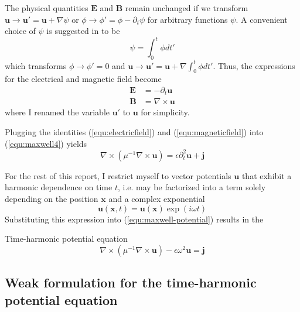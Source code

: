 \documentclass[11pt, a4paper]{article}
\begin{document}
The physical quantities $\mathbf{E}$ and $\mathbf{B}$ remain unchanged 
if we transform $\mathbf{u} \to \mathbf{u}' = \mathbf{u} + \nabla \psi$ or
$\phi \to \phi' = \phi - \partial_t \psi$ for arbitrary functions $\psi$.
A convenient choice of $\psi$ is suggested in \cite{gauge-transformation} to be
\begin{equation}
    \psi = \int_0^t \phi dt' \label{equ:gauge}
\end{equation}
which transforms $\phi \to \phi' = 0$ and $\mathbf{u} \to \mathbf{u}' = \mathbf{u}
+ \nabla \int_0^t \phi dt'$. Thus, the expressions for the electrical and
magnetic field become
\begin{align}
    \mathbf{E} &= -\partial_t \mathbf{u} \label{equ:electricfield} \\
    \mathbf{B} &= \nabla \times \mathbf{u} \label{equ:magneticfield}
\end{align}
where I renamed the variable $\mathbf{u}'$ to $\mathbf{u}$ for simplicity.

Plugging the identities (\ref{equ:electricfield}) and (\ref{equ:magneticfield})
into (\ref{equ:maxwell4}) yields 
\begin{equation}
    \nabla \times (\mu^{-1} \nabla \times \mathbf{u}) =  \epsilon \partial_t^2 \mathbf{u} + \mathbf{j} \label{equ:maxwell-potential}
\end{equation}

For the rest of this report, I restrict myself to vector potentials $\mathbf{u}$
that exhibit a harmonic dependence on time $t$, i.e. may be factorized into
a term solely depending on the position $\mathbf{x}$ and a complex exponential
\begin{equation}
    \mathbf{u}(\mathbf{x}, t) = \mathbf{u}(\mathbf{x}) \exp(i \omega t) \label{equ:time-harmonic}
\end{equation}
Substituting this expression into (\ref{equ:maxwell-potential}) results in the
\begin{fancybox}{Time-harmonic potential equation}
    \begin{equation}
     \nabla \times (\mu^{-1} \nabla \times \mathbf{u}) - \epsilon \omega^2 \mathbf{u} = \mathbf{j} \label{equ:maxwell-timeharmonic}
    \end{equation}
\end{fancybox}

\subsection{Weak formulation for the time-harmonic potential equation}
\label{subsec:maxwell-weak}
\end{document}
